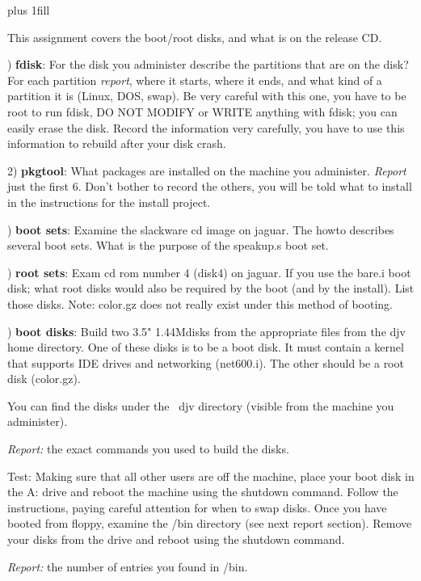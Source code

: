 
\rightskip=0pt plus 1fill

\parindent 0pt

This assignment covers the boot/root disks, and what is on the release CD.

) {\bf fdisk}:
For the disk you administer describe the partitions that are on the disk?
For each partition {\it report}, where it starts, where it ends, and what kind
of a partition it is (Linux, DOS, swap).
Be very careful with this one, you have to be root to run fdisk,
DO NOT MODIFY or WRITE anything with fdisk; 
you can easily erase the disk.
Record the information very carefully, you have to use this information
to rebuild after your disk crash.

2) {\bf pkgtool}:
What packages are installed on the machine you administer.
{\it Report} just the first 6. Don't bother to record the others, you will
be told what to install in the instructions for the install project.

) {\bf boot sets}:
Examine the slackware cd image on {\ltt{}jaguar}.
The howto describes several boot sets.
What is the purpose of the {\ltt{}speakup.s} boot set.

) {\bf root sets}:
Exam cd rom number 4 (disk4) on {\ltt{}jaguar}.
If you use the {\ltt{}bare.i} boot disk;
what root disks would also be required by the boot (and
by the install).
List those disks. Note: {\ltt{}color.gz} does not really
exist under this method of booting.

) {\bf boot disks}:
Build two 3.5" 1.44Mdisks from the appropriate files from the {\ltt{}djv} home directory.
One of these disks is to be a boot disk.
It must contain a kernel that supports IDE drives
and networking ({\ltt{}net600.i}).
The other should be a root disk ({\ltt{}color.gz}).

You can find the disks under the {\ltt{}~djv}
directory (visible from the machine you administer).

{\it Report:} the exact commands you used to build the disks.

Test: Making sure that all other users are off the machine,
place your boot disk in the A: drive and
reboot the machine using the shutdown command.
Follow the instructions, paying careful attention for when to swap disks.
Once you have booted from floppy, examine the {\ltt{}/bin} directory
(see next report section).
Remove your disks from the drive and reboot using the shutdown command.

{\it Report:} the number of entries you found in {\ltt{}/bin}.

\bye
